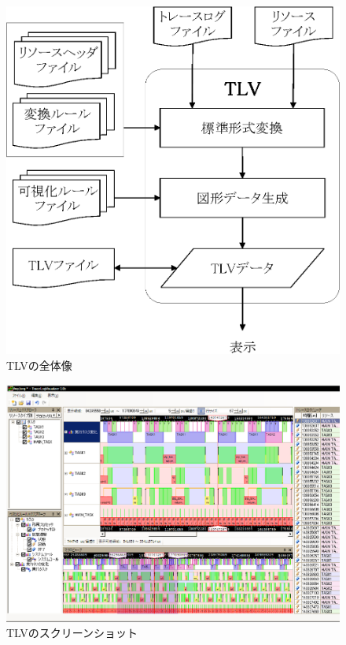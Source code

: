\begin{figure}[!t]
\begin{center}
\includegraphics[scale=0.7]{img/tlv.eps}
\caption{TLVの全体像}
\label{fig:tlv}
\end{center}
\end{figure}

\begin{figure}[!t]
\begin{center}
\includegraphics[scale=0.7]{img/TLVscreenshot.eps}
\caption{TLVのスクリーンショット}
\label{fig:TLVscreenshot}
\end{center}
\end{figure}

